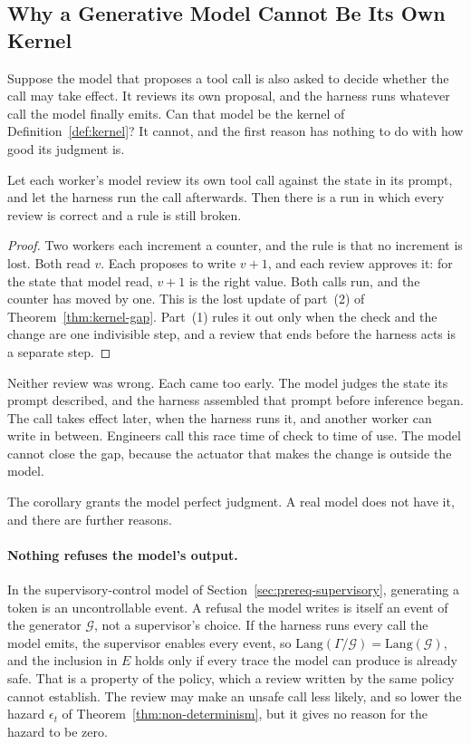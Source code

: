 \subsection{Why a Generative Model Cannot Be Its Own Kernel}\label{sec:prereq-no-self-kernel}
Suppose the model that proposes a tool call is also asked to decide whether
the call may take effect. It reviews its own proposal, and the harness runs
whatever call the model finally emits. Can that model be the kernel of
Definition~\ref{def:kernel}? It cannot, and the first reason has nothing to
do with how good its judgment is.

\begin{corollary}\label{cor:no-self-kernel}
Let each worker's model review its own tool call against the state in its
prompt, and let the harness run the call afterwards. Then there is a run in
which every review is correct and a rule is still broken.
\end{corollary}

\begin{proof}
Two workers each increment a counter, and the rule is that no increment is
lost. Both read $v$. Each proposes to write $v+1$, and each review approves
it: for the state that model read, $v+1$ is the right value. Both calls run,
and the counter has moved by one. This is the lost update of part~(2) of
Theorem~\ref{thm:kernel-gap}. Part~(1) rules it out only when the check and
the change are one indivisible step, and a review that ends before the
harness acts is a separate step.
\end{proof}

Neither review was wrong. Each came too early. The model judges the state its
prompt described, and the harness assembled that prompt before inference
began. The call takes effect later, when the harness runs it, and another
worker can write in between. Engineers call this race time of check to time
of use. The model cannot close the gap, because the actuator that makes the
change is outside the model.

The corollary grants the model perfect judgment. A real model does not have
it, and there are further reasons.

\paragraph{Nothing refuses the model's output.}
In the supervisory-control model of Section~\ref{sec:prereq-supervisory},
generating a token is an uncontrollable event. A refusal the model writes is
itself an event of the generator $\mathcal G$, not a supervisor's choice. If
the harness runs every call the model emits, the supervisor enables every
event, so $\mathrm{Lang}(\Gamma/\mathcal G)=\mathrm{Lang}(\mathcal G)$, and the
inclusion in $E$ holds only if every trace the model can produce is already
safe. That is a property of the policy, which a review written by the same
policy cannot establish. The review may make an unsafe call less likely, and
so lower the hazard $\epsilon_t$ of Theorem~\ref{thm:non-determinism}, but it
gives no reason for the hazard to be zero.

